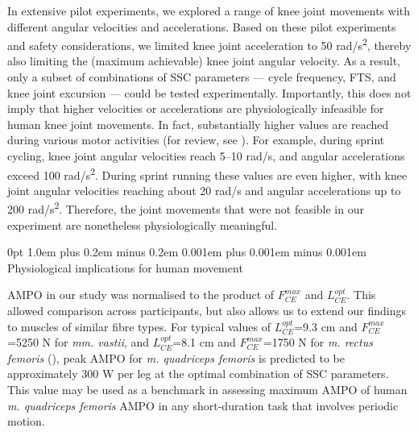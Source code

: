 \documentclass[
  11pt,
  a4paper]{article}
\makeatletter
\newcounter{none} %
\renewcommand{\subsection}{%
  \@startsection{subsection}{2}
    {0pt} 					%
    {1.0em plus 0.2em minus 0.2em} 	%
    {0.001em plus 0.001em minus 0.001em}    	%
    {\large\bfseries\sffamily}%
}
\makeatother
\begin{document}
In extensive pilot experiments, we explored a range of knee joint
movements with different angular velocities and accelerations. Based on
these pilot experiments and safety considerations, we limited knee joint
acceleration to 50 rad/s\textsuperscript{2}, thereby also limiting the
(maximum achievable) knee joint angular velocity. As a result, only a
subset of combinations of SSC parameters --- cycle frequency, FTS, and
knee joint excursion --- could be tested experimentally. Importantly,
this does not imply that higher velocities or accelerations are
physiologically infeasible for human knee joint movements. In fact,
substantially higher values are reached during various motor activities
(for review, see ). For example, during sprint cycling, knee joint angular
velocities reach 5--10 rad/s, and angular accelerations exceed 100
rad/s\textsuperscript{2}. During sprint running these values are even
higher, with knee joint angular velocities reaching about 20 rad/s and
angular accelerations up to 200 rad/s\textsuperscript{2}. Therefore, the
joint movements that were not feasible in our experiment are nonetheless
physiologically meaningful.

\subsection{Physiological implications for human
movement}\label{physiological-implications-for-human-movement}

AMPO in our study was normalised to the product of \(F_{CE}^{max}\) and
\(L_{CE}^{opt}\). This allowed comparison across participants, but also
allows us to extend our findings to muscles of similar fibre types. For
typical values of \(L_{CE}^{opt}\)=9.3 cm and \(F_{CE}^{max}\)=5250 N
for \emph{mm. vastii}, and \(L_{CE}^{opt}\)=8.1 cm and
\(F_{CE}^{max}\)=1750 N for \emph{m. rectus femoris}
(), peak AMPO
for \emph{m. quadriceps femoris} is predicted to be approximately 300 W
per leg at the optimal combination of SSC parameters. This value may be
used as a benchmark in assessing maximum AMPO of human \emph{m.
quadriceps femoris} AMPO in any short-duration task that involves
periodic motion.
\end{document}
